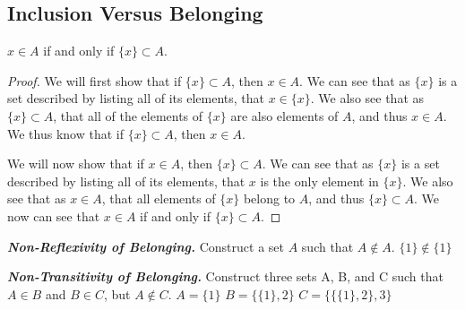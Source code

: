 \subsection{Inclusion Versus Belonging}%
            \begin{majorEx}%
            $x \in A$ if and only if $\{x\} \subset A$.
            \end{majorEx}

\begin{proof} We will first show that if $\{x\} \subset A$, then $x \in A$. We can see that as $\{x\}$ is a set described by listing all of its elements, that $x \in \{x\}$. We also see that
as $\{x\} \subset A$, that all of the elements of $\{x\}$ are also elements of $A$, and thus $x \in A$. We thus know that if $\{x\} \subset A$, then $x \in A$.

We will now show that if $x \in A$, then $\{x\} \subset A$. We can see that as $\{x\}$ is a set described by listing all of its elements, that $x$ is the only element in $\{x\}$.
We also see that as $x \in A$, that all elements of $\{ x\}$ belong to $A$, and thus $\{x\} \subset A$. We now can see that $x \in A$ if and only if $\{x\} \subset A$.
\end{proof}
			
            \begin{majorEx}%
            \textbf{\textit{Non-Reflexivity of Belonging.}} Construct a set $A$ such that $A \not\in A$.
            \newline $\{1\} \not\in \{1\}$
            \end{majorEx}
            
            \begin{majorEx}%
            \textbf{\textit{Non-Transitivity of Belonging.}} Construct three sets A, B, and C such that $A \in B$ and $B \in C$, but $A \not \in C$.
            \newline $A = \{1\}$
            \newline $B = \{\{1\}, 2\}$
            \newline $C = \{\{\{1\}, 2\}, 3\}$
            \end{majorEx}
            
